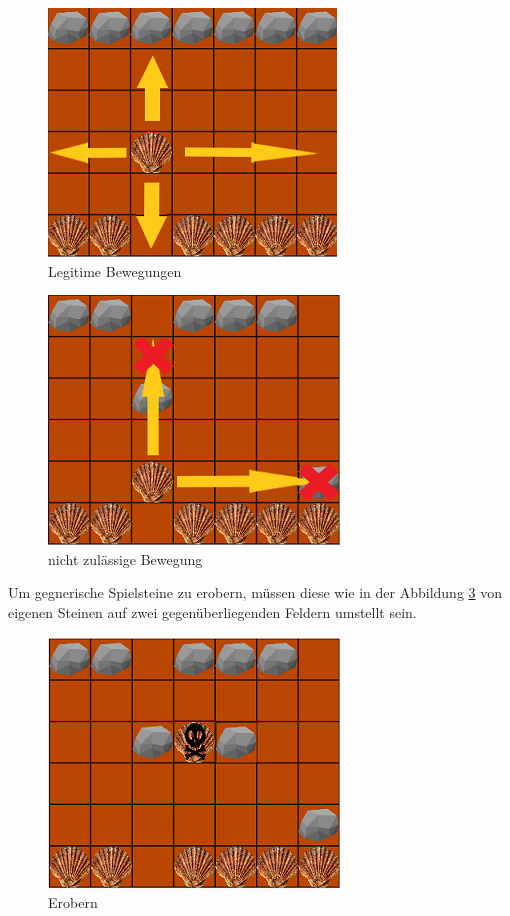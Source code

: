 \begin{figure}[h]
	\centering
	\includegraphics{img/regeln_bewegung22}
	\caption{Legitime Bewegungen}
	\label{fig:Bewegungen}
\end{figure}

\begin{figure}[h]
	\centering
	\includegraphics{img/regeln_nottodo2}
	\caption{nicht zulässige Bewegung}
	\label{fig:nottodo}
\end{figure}

Um gegnerische Spielsteine zu erobern, müssen diese wie in der Abbildung \ref{fig:erobern} von eigenen Steinen auf zwei gegenüberliegenden Feldern umstellt sein.


\begin{figure}[h]
	\centering
	\includegraphics{img/regeln_erobern2}
	\caption{Erobern}
	\label{fig:erobern}
\end{figure}



